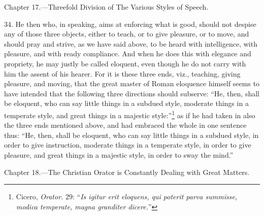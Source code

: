 
Chapter 17.—Threefold Division of The Various Styles of Speech.

34. He then who, in speaking, aims at enforcing what is good, should not despise any of those three objects, either to teach, or to give pleasure, or to move, and should pray and strive, as we have said above, to be heard with intelligence, with pleasure, and with ready compliance. And when he does this with elegance and propriety, he may justly be called eloquent, even though he do not carry with him the assent of his hearer. For it is these three ends, viz., teaching, giving pleasure, and moving, that the great master of Roman eloquence himself seems to have intended that the following three directions should subserve: “He, then, shall be eloquent, who can say little things in a subdued style, moderate things in a temperate style, and great things in a majestic style:”\footnote{Cicero, \emph{Orator.} 29: “\emph{Is igitur erit eloquens, qui poterit parva summisse, modica temperate, magna granditer dicere.}”} as if he had taken in also the three ends mentioned above, and had embraced the whole in one sentence thus: “He, then, shall be eloquent, who can say little things in a subdued style, in order to give instruction, moderate things in a temperate style, in order to give pleasure, and great things in a majestic style, in order to sway the mind.”


Chapter 18.—The Christian Orator is Constantly Dealing with Great Matters.

